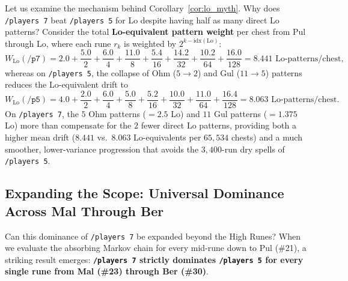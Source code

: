 \documentclass[11pt,reqno]{amsart}
\theoremstyle{definition}
\begin{document}
Let us examine the mechanism behind Corollary~\ref{cor:lo_myth}. Why does \texttt{/players~7} beat \texttt{/players~5} for Lo despite having half as many direct Lo patterns? Consider the total \textbf{Lo-equivalent pattern weight} per chest from Pul through Lo, where each rune $r_k$ is weighted by $2^{k - \text{idx}(\text{Lo})}$:
\begin{equation}
    W_{\text{Lo}}(\texttt{/p7}) = 2.0 + \frac{5.0}{2} + \frac{6.0}{4} + \frac{11.0}{8} + \frac{5.4}{16} + \frac{14.2}{32} + \frac{10.2}{64} + \frac{16.0}{128} = \mathbf{8.441}\text{ Lo-patterns/chest},
\end{equation}
whereas on \texttt{/players~5}, the collapse of Ohm ($5 \to 2$) and Gul ($11 \to 5$) patterns reduces the Lo-equivalent drift to
\begin{equation}
    W_{\text{Lo}}(\texttt{/p5}) = 4.0 + \frac{2.0}{2} + \frac{6.0}{4} + \frac{5.0}{8} + \frac{5.2}{16} + \frac{10.0}{32} + \frac{11.0}{64} + \frac{16.4}{128} = \mathbf{8.063}\text{ Lo-patterns/chest}.
\end{equation}
On \texttt{/players~7}, the $5$ Ohm patterns ($= 2.5$ Lo) and $11$ Gul patterns ($= 1.375$ Lo) more than compensate for the $2$ fewer direct Lo patterns, providing both a higher mean drift ($8.441$ vs.\ $8.063$ Lo-equivalents per $65{,}534$ chests) and a much smoother, lower-variance progression that avoids the $3{,}400$-run dry spells of \texttt{/players~5}.

\subsection{Expanding the Scope: Universal Dominance Across Mal Through Ber}
\label{subsec:mal_ber_dominance}

Can this dominance of \texttt{/players~7} be expanded beyond the High Runes? When we evaluate the absorbing Markov chain for every mid-rune down to Pul (\#21), a striking result emerges: \textbf{\texttt{/players~7} strictly dominates \texttt{/players~5} for every single rune from Mal (\#23) through Ber (\#30)}.
\end{document}
